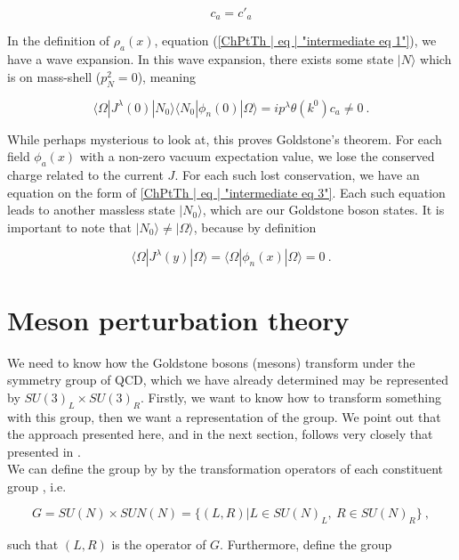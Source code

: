 \documentclass[10pt,twoside]{report}
\begin{document}
	\begin{equation}
		c_a = c'_a
	\end{equation}
	
	In the definition of $\rho_a(x)$, equation (\ref{ChPtTh | eq | "intermediate eq 1"}), we have a wave expansion. In this wave expansion, there exists some state $|N\rangle$ which is on mass-shell ($p_N^2=0$), meaning
	
	\begin{equation}
	\langle\Omega|J^\lambda(0)|N_0\rangle\langle N_0|\phi_n(0)|\Omega\rangle = ip^\lambda\theta(k^0)c_a \neq 0 \:.
	\end{equation}
	
	While perhaps mysterious to look at, this proves Goldstone's theorem. For each field $\phi_a(x)$ with a non-zero vacuum expectation value, we lose the conserved charge related to the current $J$. For each such lost conservation, we have an equation on the form of \ref{ChPtTh | eq | "intermediate eq 3"}. Each such equation leads to another massless state $|N_0\rangle$, which are our Goldstone boson states. It is important to note that $|N_0\rangle \neq |\Omega\rangle$, because by definition
	
	\begin{equation}
		\langle\Omega|J^\lambda(y)|\Omega\rangle = \langle\Omega|\phi_n(x)|\Omega\rangle = 0 \:.
	\end{equation}
	
	\section{Meson perturbation theory}
	We need to know how the Goldstone bosons (mesons) transform under the symmetry group of QCD, which we have already determined may be represented by $SU(3)_L\times SU(3)_R$. Firstly, we want to know how to transform something with this group, then we want a representation of the group. We point out that the approach presented here, and in the next section, follows very closely that presented in \cite{SchererSchingler12}.\\
	
	We can define the group by by the transformation operators of each constituent group \cite{SchererSchingler12}, i.e.
	
	\begin{equation}
		G = SU(N)\times SUN(N) = \{(L,R)|L\in SU(N)_L,\: R\in SU(N)_R\} \:,
	\end{equation}
	
	\noindent such that $(L,R)$ is the operator of $G$. Furthermore, define the group
	
\end{document}
